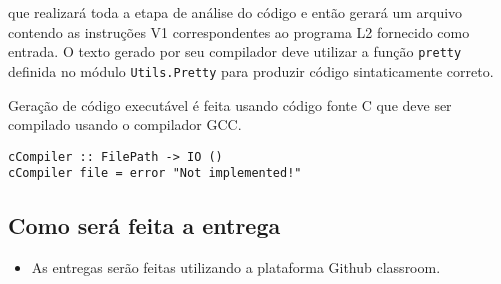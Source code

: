 \documentclass[a4paper,11pt]{article}
\begin{document}
que realizará toda a etapa de análise do código e então gerará um arquivo contendo
as instruções V1 correspondentes ao programa L2 fornecido como entrada. O texto
gerado por seu compilador deve utilizar a função \texttt{pretty} definida no módulo
\texttt{Utils.Pretty} para produzir código sintaticamente correto.

Geração de código executável é feita usando código fonte C que deve ser compilado
usando o compilador GCC.

\begin{verbatim}
cCompiler :: FilePath -> IO ()
cCompiler file = error "Not implemented!"
\end{verbatim}
\subsection*{Como será feita a entrega}
\label{sec:org4b84471}

\begin{itemize}
\item As entregas serão feitas utilizando a plataforma Github classroom.
\end{itemize}
\end{document}
